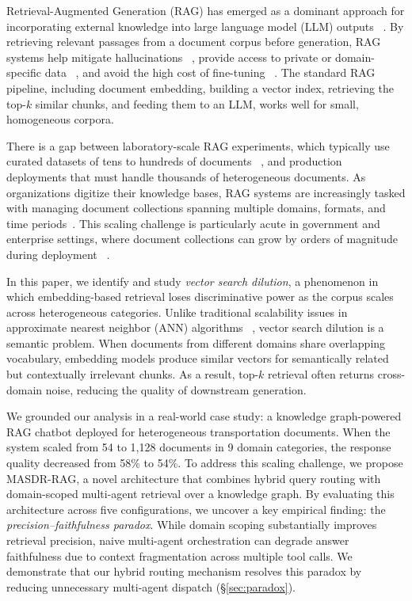 \documentclass{article}
\newcommand{\systemname}{\textsc{MASDR-RAG}}
\newcommand{\numDocs}{1{,}128}
\begin{document}
Retrieval-Augmented Generation (RAG) has emerged as a dominant approach for incorporating external knowledge into large language model (LLM) outputs ~\citep{lewis2020rag, guu2020realm}. By retrieving relevant passages from a document corpus before generation, RAG systems help mitigate hallucinations ~\citep{shuster2021retrieval, huang2024hallucination}, provide access to private or domain-specific data ~\citep{gao2024ragsurvey}, and avoid the high cost of fine-tuning ~\citep{izacard2023atlas}. The standard RAG pipeline, including document embedding, building a vector index, retrieving the top-$k$ similar chunks, and feeding them to an LLM, works well for small, homogeneous corpora.

There is a gap between laboratory-scale RAG experiments, which typically use curated datasets of tens to hundreds of documents ~\citep{kwiatkowski2019natural, joshi2017triviaqa}, and production deployments that must handle thousands of heterogeneous documents. As organizations digitize their knowledge bases, RAG systems are increasingly tasked with managing document collections spanning multiple domains, formats, and time periods~\citep{barnett2024seven}. This scaling challenge is particularly acute in government and enterprise settings, where document collections can grow by orders of magnitude during deployment ~\citep{wu2025rag4cm}.

In this paper, we identify and study \textit{vector search dilution}, a phenomenon in which embedding-based retrieval loses discriminative power as the corpus scales across heterogeneous categories. Unlike traditional scalability issues in approximate nearest neighbor (ANN) algorithms ~\citep{malkov2020hnsw, johnson2021faiss}, vector search dilution is a semantic problem. When documents from different domains share overlapping vocabulary, embedding models produce similar vectors for semantically related but contextually irrelevant chunks. As a result, top-$k$ retrieval often returns cross-domain noise, reducing the quality of downstream generation.

We grounded our analysis in a real-world case study: a knowledge graph-powered RAG chatbot deployed for heterogeneous transportation documents. When the system scaled from 54 to \numDocs{} documents in 9 domain categories, the response quality decreased from 58\% to 54\%. 
To address this scaling challenge, we propose \systemname{}, a novel architecture that combines hybrid query routing with domain-scoped multi-agent retrieval over a knowledge graph. 
By evaluating this architecture across five configurations, we uncover a key empirical finding: the \textit{precision--faithfulness paradox}. While domain scoping substantially improves retrieval precision, naive multi-agent orchestration can degrade answer faithfulness due to context fragmentation across multiple tool calls. We demonstrate that our hybrid routing mechanism resolves this paradox by reducing unnecessary multi-agent dispatch (\S\ref{sec:paradox}).
\end{document}
